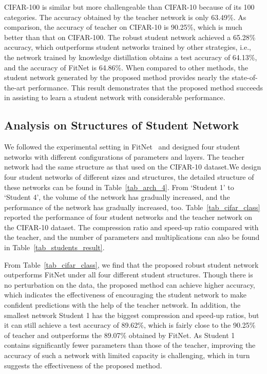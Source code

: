 \documentclass[journal]{IEEEtran}
\newcommand{\Tref}[1]{Table~\ref{#1}}
\begin{document}
CIFAR-100 is similar but more challengeable than CIFAR-10 because of its 100 categories. The accuracy obtained by the teacher network is only 63.49\%. As comparison, the accuracy of teacher on CIFAR-10 is 90.25\%, which is much better than that on CIFAR-100. The robust student network achieved a 65.28\% accuracy, which outperforms student networks trained by other strategies, i.e., the network trained by knowledge distillation obtains a test accuracy of 64.13\%, and the accuracy of FitNet is 64.86\%. When compared to other methods, the student network generated by the proposed method provides nearly the state-of-the-art performance. This result demonstrates that the proposed method succeeds in assisting to learn a student network with considerable performance.





\subsection{Analysis on Structures of Student Network}
We followed the experimental setting in FitNet~\cite{romero2014fitnets} and designed four student networks with different configurations of parameters and layers. The teacher network had the same structure as that used on the CIFAR-10 dataset.We design four student networks of different sizes and structures, the detailed structure of these networks can be found in \Tref{tab_arch_4}. From `Student 1' to `Student 4', the volume of the network has gradually increased, and the performance of the network has gradually increased, too. \Tref{tab_cifar_class} reported the performance of four student networks and the teacher network on the CIFAR-10 dataset. The compression ratio and speed-up ratio compared with the teacher, and the number of parameters and multiplications can also be found in \Tref{tab_students_result}.

From \Tref{tab_cifar_class}, we find that the proposed robust student network outperforms FitNet under all four different student structures. Though there is no perturbation on the data, the proposed method can achieve higher accuracy, which indicates the effectiveness of encouraging the student network to make confident predictions with the help of the teacher network. In addition, the smallest network Student 1 has the biggest compression and speed-up ratios, but it can still achieve a test accuracy of 89.62\%, which is fairly close to the 90.25\% of teacher and outperforms the 89.07\% obtained by FitNet. As Student 1 contains significantly fewer parameters than those of the teacher, improving the accuracy of such a network with limited capacity is challenging, which in turn suggests the effectiveness of the proposed method.
\end{document}
